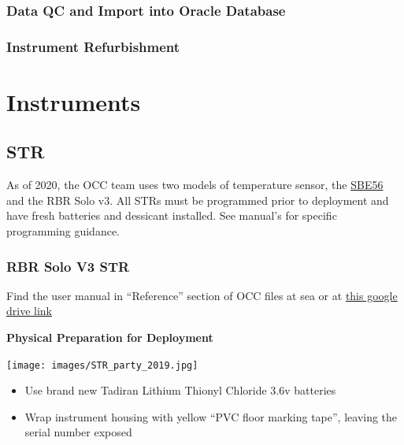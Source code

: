 \documentclass[]{book}
\begin{document}
\hypertarget{data-qc-and-import-into-oracle-database}{%
\section{Data QC and Import into Oracle Database}\label{data-qc-and-import-into-oracle-database}}

\hypertarget{instrument-refurbishment}{%
\section{Instrument Refurbishment}\label{instrument-refurbishment}}

\hypertarget{part-instruments}{%
\part*{Instruments}\label{part-instruments}}

\hypertarget{str}{%
\chapter{STR}\label{str}}

As of 2020, the OCC team uses two models of temperature sensor, the \protect\hyperlink{sbe56}{SBE56} and the RBR Solo v3. All STRs must be programmed prior to deployment and have fresh batteries and dessicant installed. See manual's for specific programming guidance.

\hypertarget{rbr-solo-v3-str}{%
\section{RBR Solo V3 STR}\label{rbr-solo-v3-str}}

Find the user manual in ``Reference'' section of OCC files at sea or at \href{https://drive.google.com/drive/folders/1U-g1gTLOArcf7o5yXx-76z2HU-ha1qCJ}{this google drive link}

\textbf{Physical Preparation for Deployment}

\texttt{[image: images/STR\_party\_2019.jpg]}

\begin{itemize}
\item
  Use brand new Tadiran Lithium Thionyl Chloride 3.6v batteries
\item
  Wrap instrument housing with yellow ``PVC floor marking tape'', leaving the serial number exposed
\end{itemize}
\end{document}
